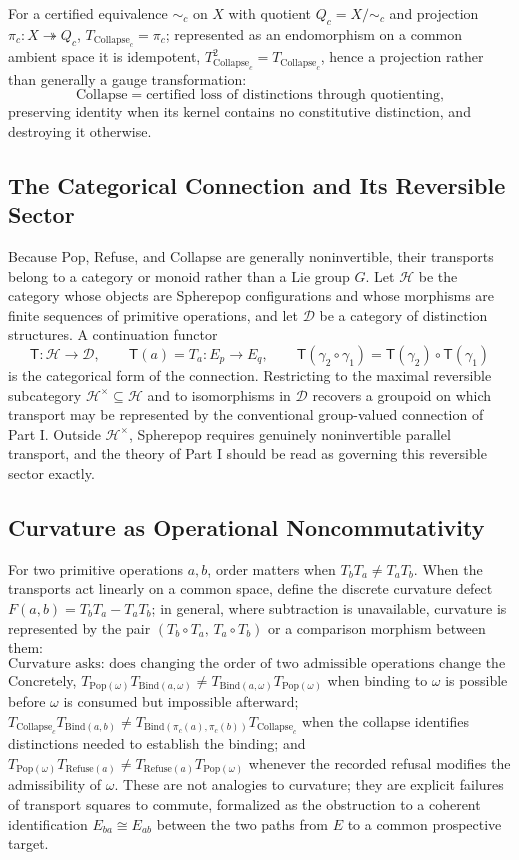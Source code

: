 \documentclass[11pt]{article}
\newcommand{\Pop}{\mathrm{Pop}}
\newcommand{\Refuse}{\mathrm{Refuse}}
\newcommand{\Bind}{\mathrm{Bind}}
\newcommand{\Collapse}{\mathrm{Collapse}}
\begin{document}
For a certified equivalence $\sim_c$ on $X$ with quotient $Q_c = X/{\sim_c}$ and projection $\pi_c : X \twoheadrightarrow Q_c$, $T_{\Collapse_c} = \pi_c$; represented as an endomorphism on a common ambient space it is idempotent, $T_{\Collapse_c}^2 = T_{\Collapse_c}$, hence a projection rather than generally a gauge transformation:
\[
\Collapse = \text{certified loss of distinctions through quotienting,}
\]
preserving identity when its kernel contains no constitutive distinction, and destroying it otherwise.

\subsection{The Categorical Connection and Its Reversible Sector}

Because Pop, Refuse, and Collapse are generally noninvertible, their transports belong to a category or monoid rather than a Lie group $G$. Let $\mathcal{H}$ be the category whose objects are Spherepop configurations and whose morphisms are finite sequences of primitive operations, and let $\mathcal{D}$ be a category of distinction structures. A continuation functor
\[
\mathsf{T} : \mathcal{H} \longrightarrow \mathcal{D}, \qquad \mathsf{T}(a) = T_a : E_p \to E_q, \qquad \mathsf{T}(\gamma_2 \circ \gamma_1) = \mathsf{T}(\gamma_2) \circ \mathsf{T}(\gamma_1)
\]
is the categorical form of the connection. Restricting to the maximal reversible subcategory $\mathcal{H}^\times \subseteq \mathcal{H}$ and to isomorphisms in $\mathcal{D}$ recovers a groupoid on which transport may be represented by the conventional group-valued connection of Part I. Outside $\mathcal{H}^\times$, Spherepop requires genuinely noninvertible parallel transport, and the theory of Part I should be read as governing this reversible sector exactly.

\subsection{Curvature as Operational Noncommutativity}

For two primitive operations $a, b$, order matters when $T_b T_a \neq T_a T_b$. When the transports act linearly on a common space, define the discrete curvature defect $F(a,b) = T_b T_a - T_a T_b$; in general, where subtraction is unavailable, curvature is represented by the pair $(T_b \circ T_a,\, T_a \circ T_b)$ or a comparison morphism between them:
\[
\text{Curvature asks: does changing the order of two admissible operations change the future distinction structure?}
\]
Concretely, $T_{\Pop(\omega)} T_{\Bind(a,\omega)} \neq T_{\Bind(a,\omega)} T_{\Pop(\omega)}$ when binding to $\omega$ is possible before $\omega$ is consumed but impossible afterward; $T_{\Collapse_c} T_{\Bind(a,b)} \neq T_{\Bind(\pi_c(a), \pi_c(b))} T_{\Collapse_c}$ when the collapse identifies distinctions needed to establish the binding; and $T_{\Pop(\omega)} T_{\Refuse(a)} \neq T_{\Refuse(a)} T_{\Pop(\omega)}$ whenever the recorded refusal modifies the admissibility of $\omega$. These are not analogies to curvature; they are explicit failures of transport squares to commute, formalized as the obstruction to a coherent identification $E_{ba} \cong E_{ab}$ between the two paths from $E$ to a common prospective target.
\end{document}

